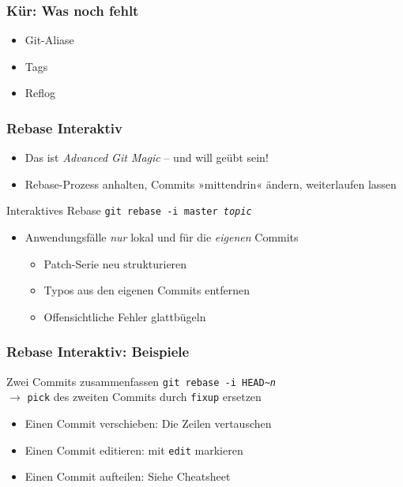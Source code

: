 \documentclass{beamer}
\begin{document}
\begin{frame}
 \frametitle{Kür: Was noch fehlt}
\begin{itemize}
	\item Git-Aliase
	\item Tags
	\item Reflog
\end{itemize}


 \end{frame}


\begin{frame}
 \frametitle{Rebase Interaktiv}
\begin{itemize}
	\item Das ist \emph{Advanced Git Magic} -- und will geübt sein!
	\item Rebase-Prozess anhalten, Commits »mittendrin« ändern, weiterlaufen lassen
\end{itemize}

\begin{block}{Interaktives Rebase}
\texttt{git rebase -i master \emph{topic}}
\end{block}

\begin{itemize}
	\item Anwendungsfälle \emph{nur} lokal und für die \emph{eigenen} Commits
\begin{itemize}
	\item Patch-Serie neu strukturieren
	\item Typos aus den eigenen Commits entfernen
	\item Offensichtliche Fehler glattbügeln
\end{itemize}
\end{itemize}
 \end{frame}

\begin{frame}
 \frametitle{Rebase Interaktiv: Beispiele}



\begin{block}{Zwei Commits zusammenfassen}
\texttt{git rebase -i HEAD\textasciitilde{}\emph{n}}\\
$\rightarrow$ \texttt{pick} des zweiten Commits durch \texttt{fixup} ersetzen
\end{block}

\begin{itemize}
	\item Einen Commit verschieben: Die Zeilen vertauschen
	\item Einen Commit editieren: mit \texttt{edit} markieren
	\item Einen Commit aufteilen: Siehe Cheatsheet
\end{itemize}
 \end{frame}
\end{document}
